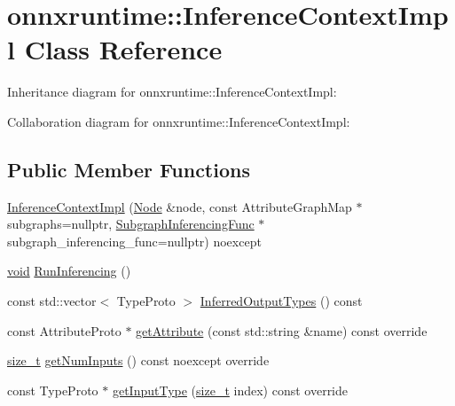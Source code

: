 \hypertarget{classonnxruntime_1_1InferenceContextImpl}{}\section{onnxruntime\+:\+:Inference\+Context\+Impl Class Reference}
\label{classonnxruntime_1_1InferenceContextImpl}


Inheritance diagram for onnxruntime\+:\+:Inference\+Context\+Impl\+:


Collaboration diagram for onnxruntime\+:\+:Inference\+Context\+Impl\+:
\subsection*{Public Member Functions}
\begin{DoxyCompactItemize}
\item 
\mbox{\hyperlink{classonnxruntime_1_1InferenceContextImpl_ac39d7cacfaebe411651b9cef1d3b16a2}{Inference\+Context\+Impl}} (\mbox{\hyperlink{classonnxruntime_1_1Node}{Node}} \&node, const Attribute\+Graph\+Map $\ast$subgraphs=nullptr, \mbox{\hyperlink{namespaceonnxruntime_ae184f68a858158d9595f3fe260b05dfb}{Subgraph\+Inferencing\+Func}} $\ast$subgraph\+\_\+inferencing\+\_\+func=nullptr) noexcept
\item 
\mbox{\hyperlink{mlasi_8h_a88f941d423cb2a819b70a1358982b1a6}{void}} \mbox{\hyperlink{classonnxruntime_1_1InferenceContextImpl_a03867e44217366769507abf47d0a237d}{Run\+Inferencing}} ()
\item 
const std\+::vector$<$ Type\+Proto $>$ \mbox{\hyperlink{classonnxruntime_1_1InferenceContextImpl_a676796a4ac3f6c6fb523d39b4945c4a1}{Inferred\+Output\+Types}} () const
\item 
const Attribute\+Proto $\ast$ \mbox{\hyperlink{classonnxruntime_1_1InferenceContextImpl_ae88965a10d7827fc364d9ca3717c4754}{get\+Attribute}} (const std\+::string \&name) const override
\item 
\mbox{\hyperlink{mlasi_8h_a503efbc1c6e50825320ad909366b78ab}{size\+\_\+t}} \mbox{\hyperlink{classonnxruntime_1_1InferenceContextImpl_a746e9bef7556f5396035691aee180fe1}{get\+Num\+Inputs}} () const noexcept override
\item 
const Type\+Proto $\ast$ \mbox{\hyperlink{classonnxruntime_1_1InferenceContextImpl_af2af6aa91a8dbdb477866da91856cbca}{get\+Input\+Type}} (\mbox{\hyperlink{mlasi_8h_a503efbc1c6e50825320ad909366b78ab}{size\+\_\+t}} index) const override
\item 

\end{DoxyCompactItemize}
